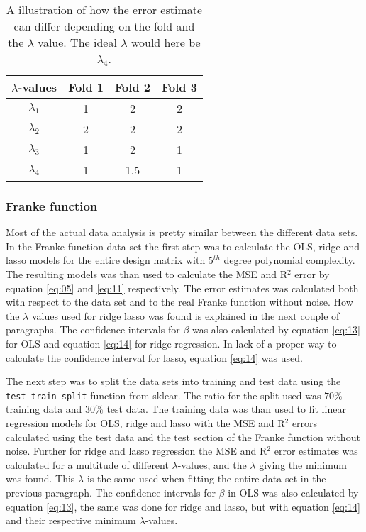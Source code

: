 \documentclass[uio,jmp,amsmath,amssymb,reprint,nofootinbib]{revtex4-1}
\numberwithin{equation}{section}
\begin{document}
\begin{table}
\begin{tabular}{|c|c|c|c|}\hline
\(\lambda\)-values & Fold 1 & Fold 2 & Fold 3 \\ \hline
\(\lambda_{1}\) & 1 & 2 & 2\\ \hline
\(\lambda_{2}\) & 2 & 2 & 2 \\ \hline
\(\lambda_{3}\) & 1 & 2 & 1 \\ \hline
\(\lambda_{4}\) & 1 & 1.5 & 1 \\ \hline
\end{tabular}
\caption{A illustration of how the error estimate can differ depending on the fold and the \(\lambda\) value. The ideal \(\lambda\) would here be \(\lambda_4\).}
\label{tab:01}
\end{table}

\subsubsection{Franke function}

Most of the actual data analysis is pretty similar between the different data sets. 
In the Franke function data set the first step was to calculate the OLS, ridge and lasso models for the entire design matrix with 5\(^{th}\) degree polynomial complexity. The resulting models was than used to calculate the MSE and R\(^2\) error by equation \ref{eq:05} and \ref{eq:11} respectively. The error estimates was calculated both with respect to the data set and to the real Franke function without noise. How the \(\lambda\) values used for ridge lasso was found is explained in the next couple of paragraphs. The confidence intervals for \(\beta\) was also calculated by equation \ref{eq:13} for OLS and equation \ref{eq:14} for ridge regression. In lack of a proper way to calculate the confidence interval for lasso, equation \ref{eq:14} was used.

The next step was to split the data sets into training and test data using the \texttt{test\_train\_split} function from sklear. The ratio for the split used was \(70\%\) training data and \(30\%\) test data. The training data was than used to fit linear regression models for OLS, ridge and lasso with the MSE and R\(^2\) errors calculated using the test data and the test section of the Franke function without noise. Further for ridge and lasso regression the MSE and R\(^2\) error estimates was calculated for a multitude of different \(\lambda\)-values, and the \(\lambda\) giving the minimum was found. This \(\lambda\) is the same used when fitting the entire data set in the previous paragraph. The confidence intervals for \(\beta\) in OLS was also calculated by equation \ref{eq:13}, the same was done for ridge and lasso, but with equation \ref{eq:14} and their respective minimum \(\lambda\)-values.
\end{document}
